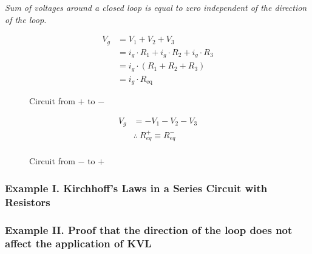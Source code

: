 \emph{Sum of voltages around a closed loop is equal to zero independent of the direction of the loop.}
\begin{figure}[ht]
  \centering
  \begin{minipage}{.5\textwidth}
    \centering
    \begin{align}
      V_g &= V_1 + V_2 + V_3 \nonumber \\
      &= i_g \cdot R_1 + i_g \cdot R_2 + i_g \cdot R_3 \nonumber \\
      &= i_g \cdot (R_1 + R_2 + R_3) \nonumber \\
      &= i_g \cdot R_{\text{eq}}
  \end{align}
    \caption{{Circuit from $+$ to $-$}}
  \end{minipage}%
  \begin{minipage}{.5\textwidth}
    \centering
    \begin{align}
      V_g &= - V_1 - V_2 - V_3 \nonumber \\
      &\therefore \  R^{+}_{eq} \equiv R^{-}_{eq} \nonumber \\
  \end{align}
    \caption{{Circuit from $-$ to $+$}}
  \end{minipage}
\end{figure}


\newpage
\subsubsection{{Example I. Kirchhoff's Laws in a Series Circuit with Resistors}}



\newpage
\subsubsection{Example II. Proof that the direction of the loop does not affect the application of KVL}

